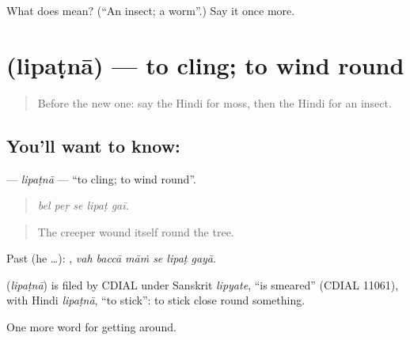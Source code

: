 \begin{tcolorbox}[breakable,colback=teal!4,colframe=teal!35!black,title={Before you move on}]
What does  mean? (\textquotedblleft{}An insect; a worm\textquotedblright{}.) Say it once more.
\end{tcolorbox}
\section[\texorpdfstring{\hi{लिपटना} (lipaṭnā)}{लिपटना (lipaṭnā)}]{ (lipaṭnā) — to cling; to wind round}

\label{lesson:HI-C447-lipatna}



\begin{quote}
Before the new one: say the Hindi for moss, then the Hindi for an insect.
\end{quote}

\subsection*{You'll want to know: }
\textbf{} — \emph{lipaṭnā} — \textquotedblleft{}to cling; to wind round\textquotedblright{}.

\begin{quote}
    
\end{quote}

\begin{quote}
\emph{bel peṛ se lipaṭ gaī.}
\end{quote}

\begin{quote}
The creeper wound itself round the tree.
\end{quote}

Past (he …):      , \emph{vah baccā māṁ se lipaṭ gayā}.

\begin{cousinweb}
\textbf{} (\emph{lipaṭnā}) is filed by CDIAL under Sanskrit \emph{lipyate}, \textquotedblleft{}is smeared\textquotedblright{} (CDIAL 11061), with Hindi \emph{lipaṭnā}, \textquotedblleft{}to stick\textquotedblright{}: to stick close round something.
\end{cousinweb}

\begin{grammarlens}[title={What you've built}]
One more word for getting around.
\end{grammarlens}

